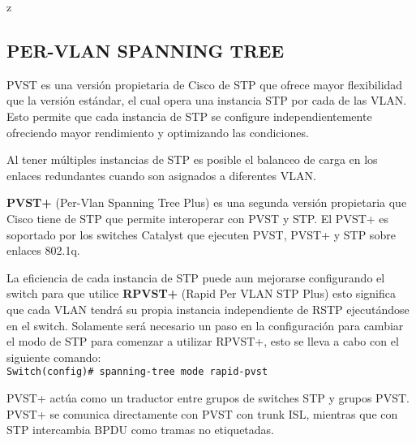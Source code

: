 z\documentclass[12pt]{article}
\begin{document}
\subsection{PER-VLAN SPANNING TREE}
PVST es una versión propietaria de Cisco de STP que ofrece mayor flexibilidad que la versión estándar, el cual opera una instancia STP por cada de las VLAN. Esto permite que cada instancia de STP se configure independientemente ofreciendo mayor rendimiento y optimizando las condiciones.\newline 

Al tener múltiples instancias de STP es posible el balanceo de carga en los enlaces redundantes cuando son asignados a diferentes VLAN.\newline

\textbf{PVST+} (Per-Vlan Spanning Tree Plus) es una segunda versión propietaria que Cisco tiene de STP que permite interoperar con PVST y STP. El PVST+ es soportado por los switches Catalyst que ejecuten PVST, PVST+ y STP sobre enlaces 802.1q.\newline

La eficiencia de cada instancia de STP puede aun mejorarse configurando el switch para que utilice \textbf{RPVST+} (Rapid Per VLAN STP Plus) esto significa que cada VLAN tendrá su propia instancia independiente de RSTP ejecutándose en el switch. Solamente será necesario un paso en la configuración para cambiar el modo de STP para comenzar a utilizar RPVST+, esto se lleva a cabo con el siguiente comando:\\

\texttt{Switch(config)\# spanning-tree mode rapid-pvst}

\vspace{10pt}
PVST+ actúa como un traductor entre grupos de switches STP y grupos PVST. PVST+ se comunica directamente con PVST con trunk ISL, mientras que con STP intercambia BPDU como tramas no etiquetadas.
\vfill


\end{document}
